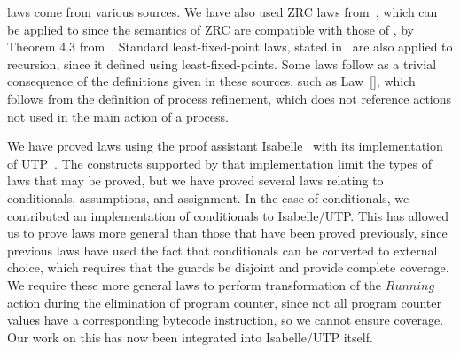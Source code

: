  laws  come from various sources.
We have also used  ZRC laws
from~\cite{cavalcanti1998}, which can be applied to \Circus{} since
the semantics of ZRC are compatible with those of \Circus{}, by
Theorem 4.3 from~\cite{oliveira2006}.
Standard least-fixed-point laws, stated in~\cite{hoare1998} are also
applied to \Circus{} recursion, since it defined using
least-fixed-points.
Some  laws follow as a trivial consequence of the
definitions given in these sources, such as
Law~[], which follows from the definition of
process refinement, which does not reference actions not used in the
main action of a process.

We have proved  laws using the proof assistant
Isabelle~\cite{nipkow2002} with its implementation of
UTP~\cite{foster2015}.
The constructs supported by that implementation limit the types of
laws that may be proved, but we have proved several laws relating to
conditionals, assumptions, and assignment.
In the case of conditionals, we contributed an implementation of
\Circus{} conditionals to Isabelle/UTP.
This has allowed us to prove laws more general than those that have
been proved previously, since previous laws have used the fact that
conditionals can be converted to external choice, which requires that
the guards be disjoint and provide complete coverage.
We require these more general laws to perform transformation of the
$Running$ action during the elimination of program counter, since not
all program counter values have a corresponding bytecode instruction,
so we cannot ensure coverage.
Our work on this has now been integrated into Isabelle/UTP itself.

